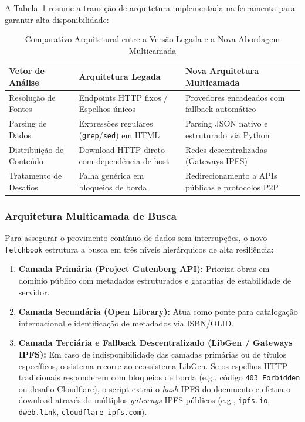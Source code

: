 \documentclass[
    12pt,
    openright,
    oneside,
    a4paper,
    english,
    brazilian
    ]{abntex2}
\begin{document}
A Tabela~\ref{tab:arquitetura} resume a transição de arquitetura implementada na ferramenta para garantir alta disponibilidade:

\begin{table}[h!]
    \centering
    \caption{Comparativo Arquitetural entre a Versão Legada e a Nova Abordagem Multicamada}
    \label{tab:arquitetura}
    \vspace{0.5em}
    \small
    \begin{tabularx}{\textwidth}{l X X}
        \toprule
        \textbf{Vetor de Análise} & \textbf{Arquitetura Legada} & \textbf{Nova Arquitetura Multicamada} \\
        \midrule
        Resolução de Fontes & Endpoints HTTP fixos / Espelhos únicos & Provedores encadeados com fallback automático \\
        Parsing de Dados & Expressões regulares (\texttt{grep}/\texttt{sed}) em HTML & Parsing JSON nativo e estruturado via Python \\
        Distribuição de Conteúdo & Download HTTP direto com dependência de host & Redes descentralizadas (Gateways IPFS) \\
        Tratamento de Desafios & Falha genérica em bloqueios de borda & Redirecionamento a APIs públicas e protocolos P2P \\
        \bottomrule
    \end{tabularx}
\end{table}

\subsubsection{Arquitetura Multicamada de Busca}

Para assegurar o provimento contínuo de dados sem interrupções, o novo \texttt{fetchbook} estrutura a busca em três níveis hierárquicos de alta resiliência:

\begin{enumerate}
    \item \textbf{Camada Primária (Project Gutenberg API):} Prioriza obras em domínio público com metadados estruturados e garantias de estabilidade de servidor.
    \item \textbf{Camada Secundária (Open Library):} Atua como ponte para catalogação internacional e identificação de metadados via ISBN/OLID.
    \item \textbf{Camada Terciária e Fallback Descentralizado (LibGen / Gateways IPFS):} Em caso de indisponibilidade das camadas primárias ou de títulos específicos, o sistema recorre ao ecossistema LibGen. Se os espelhos HTTP tradicionais responderem com bloqueios de borda (e.g., código \texttt{403 Forbidden} ou desafio Cloudflare), o script extrai o \textit{hash} IPFS do documento e efetua o download através de múltiplos \textit{gateways} IPFS públicos (e.g., \texttt{ipfs.io}, \texttt{dweb.link}, \texttt{cloudflare-ipfs.com}).
\end{enumerate}
\end{document}
